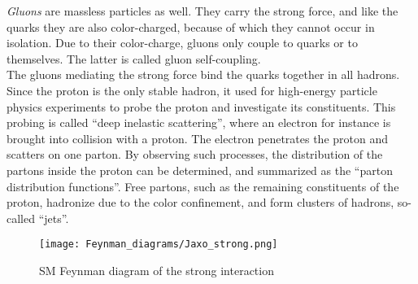 \begin{minipage}{0.55\textwidth}
\textit{Gluons} are massless particles as well.
They carry the strong force, and like the quarks they are also color-charged, because of which they cannot occur in isolation.
Due to their color-charge, gluons only couple to quarks or to themselves.
The latter is called gluon self-coupling.\\
The gluons mediating the strong force bind the quarks together in all hadrons.
Since the proton is the only stable hadron, it used for high-energy particle physics experiments to probe the proton and investigate its constituents.
This probing is called ``deep inelastic scattering'', where an electron for instance is brought into collision with a proton.
The electron penetrates the proton and scatters on one parton.
By observing such processes, the distribution of the partons inside the proton can be determined, and summarized as the ``parton distribution functions''.
Free partons, such as the remaining constituents of the proton, hadronize due to the color confinement, and form clusters of hadrons, so-called ``jets''.

\end{minipage} \hfill
\begin{minipage}{0.4\textwidth}
\centering
\begin{figure}[H]\centering
\texttt{[image: Feynman\_diagrams/Jaxo\_strong.png]}
\caption{SM Feynman diagram of the strong interaction}
\label{fig:Feynman:strong} 
\end{figure}
\end{minipage}

